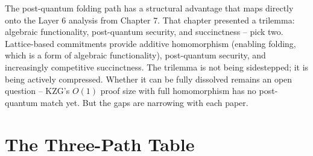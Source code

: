 \documentclass[
  11pt,
  openany]{report}
\begin{document}
The post-quantum folding path has a structural advantage that maps directly onto
the Layer 6 analysis from Chapter 7. That chapter presented a trilemma:
algebraic functionality, post-quantum security, and succinctness -- pick two.
Lattice-based commitments provide additive homomorphism (enabling folding, which
is a form of algebraic functionality), post-quantum security, and increasingly
competitive succinctness. The trilemma is not being sidestepped; it is being
actively compressed. Whether it can be fully dissolved remains an open question
-- KZG's \(O(1)\) proof size with full homomorphism has no post-quantum match
yet. But the gaps are narrowing with each paper.

\section{The Three-Path Table}\label{the-three-path-table}
\end{document}
